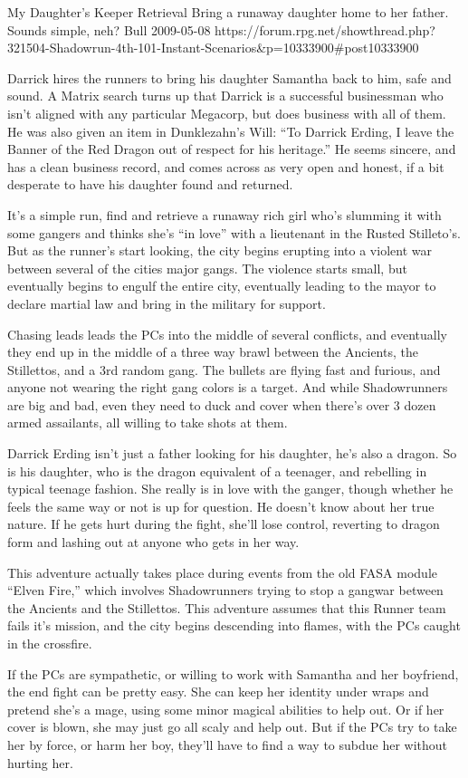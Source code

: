 \begin{scenario}{My Daughter's Keeper}
	{Retrieval}
	{Bring a runaway daughter home to her father. Sounds simple, neh?}
	{Bull}
	{2009-05-08}
	{https://forum.rpg.net/showthread.php?321504-Shadowrun-4th-101-Instant-Scenarios\&p=10333900#post10333900}

  Darrick hires the runners to bring his daughter Samantha back to him, safe and sound. A Matrix search turns up that Darrick is a successful businessman who isn't aligned with any particular Megacorp, but does business with all of them. He was also given an item in Dunklezahn's Will: ``To Darrick Erding, I leave the Banner of the Red Dragon out of respect for his heritage.'' He seems sincere, and has a clean business record, and comes across as very open and honest, if a bit desperate to have his daughter found and returned.

\synopsis  It's a simple run, find and retrieve a runaway rich girl who's slumming it with some gangers and thinks she's ``in love'' with a lieutenant in the Rusted Stilleto's. But as the runner's start looking, the city begins erupting into a violent war between several of the cities major gangs. The violence starts small, but eventually begins to engulf the entire city, eventually leading to the mayor to declare martial law and bring in the military for support.

Chasing leads leads the PCs into the middle of several conflicts, and eventually they end up in the middle of a three way brawl between the Ancients, the Stillettos, and a 3rd random gang. The bullets are flying fast and furious, and anyone not wearing the right gang colors is a target. And while Shadowrunners are big and bad, even they need to duck and cover when there's over 3 dozen armed assailants, all willing to take shots at them.

\notes Darrick Erding isn't just a father looking for his daughter, he's also a dragon. So is his daughter, who is the dragon equivalent of a teenager, and rebelling in typical teenage fashion. She really is in love with the ganger, though whether he feels the same way or not is up for question. He doesn't know about her true nature. If he gets hurt during the fight, she'll lose control, reverting to dragon form and lashing out at anyone who gets in her way.

This adventure actually takes place during events from the old FASA module ``Elven Fire,'' which involves Shadowrunners trying to stop a gangwar between the Ancients and the Stillettos. This adventure assumes that this Runner team fails it's mission, and the city begins descending into flames, with the PCs caught in the crossfire.

If the PCs are sympathetic, or willing to work with Samantha and her boyfriend, the end fight can be pretty easy. She can keep her identity under wraps and pretend she's a mage, using some minor magical abilities to help out. Or if her cover is blown, she may just go all scaly and help out. But if the PCs try to take her by force, or harm her boy, they'll have to find a way to subdue her without hurting her.

\end{scenario}